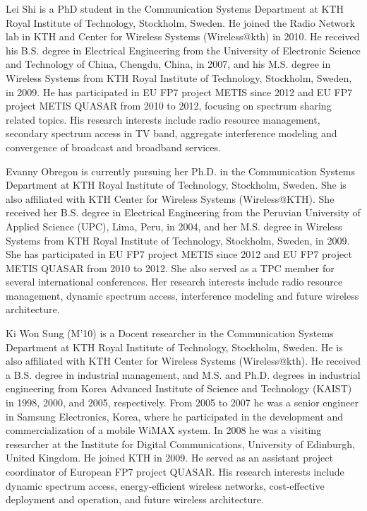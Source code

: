 \documentclass[journal]{IEEEtran}
\begin{document}
\begin{IEEEbiography}{Lei Shi}
is a PhD student in the Communication Systems Department at KTH Royal Institute of Technology, Stockholm, Sweden. He joined the Radio Network lab in KTH and Center for Wireless Systems (Wireless@kth) in 2010. He received his B.S. degree in Electrical Engineering from the University of Electronic Science and Technology of China, Chengdu, China, in 2007, and his M.S. degree in Wireless Systems from KTH Royal Institute of Technology, Stockholm, Sweden, in 2009. He has participated in EU FP7 project METIS since 2012 and EU FP7 project METIS QUASAR from 2010 to 2012, focusing on spectrum sharing related topics. His research interests include radio resource management, secondary spectrum access in TV band, aggregate interference modeling and convergence of broadcast and broadband services.
\end{IEEEbiography}

\begin{IEEEbiography}{Evanny Obregon}
is currently pursuing her Ph.D. in the Communication Systems Department at KTH Royal Institute of Technology, Stockholm, Sweden.  She is also affiliated with KTH Center for Wireless Systems (Wireless@KTH). She received her B.S. degree in Electrical Engineering from the Peruvian University of Applied Science (UPC), Lima, Peru, in 2004, and her M.S. degree in Wireless Systems from KTH Royal Institute of Technology, Stockholm, Sweden, in 2009. She has participated in EU FP7 project METIS since 2012 and EU FP7 project METIS QUASAR from 2010 to 2012. She also served as a TPC member for several international conferences. Her research interests include radio resource management, dynamic spectrum access, interference modeling and future wireless architecture.
\end{IEEEbiography}

\begin{IEEEbiography}{Ki Won Sung}
(M'10) is a Docent researcher in the Communication Systems Department at KTH Royal Institute of Technology, Stockholm, Sweden. He is also affiliated with KTH Center for Wireless Systems (Wireless@kth). He received a B.S. degree in industrial management, and M.S. and Ph.D. degrees in industrial engineering from Korea Advanced Institute of Science and Technology (KAIST) in 1998, 2000, and 2005, respectively. From 2005 to 2007 he was a senior engineer in Samsung Electronics, Korea, where he participated in the development and commercialization of a mobile WiMAX system. In 2008 he was a visiting researcher at the Institute for Digital Communications, University of Edinburgh, United Kingdom. He joined KTH in 2009. He served as an assistant project coordinator of European FP7 project QUASAR. His research interests include dynamic spectrum access, energy-efficient wireless networks, cost-effective deployment and operation, and future wireless architecture.
\end{IEEEbiography}
\end{document}
